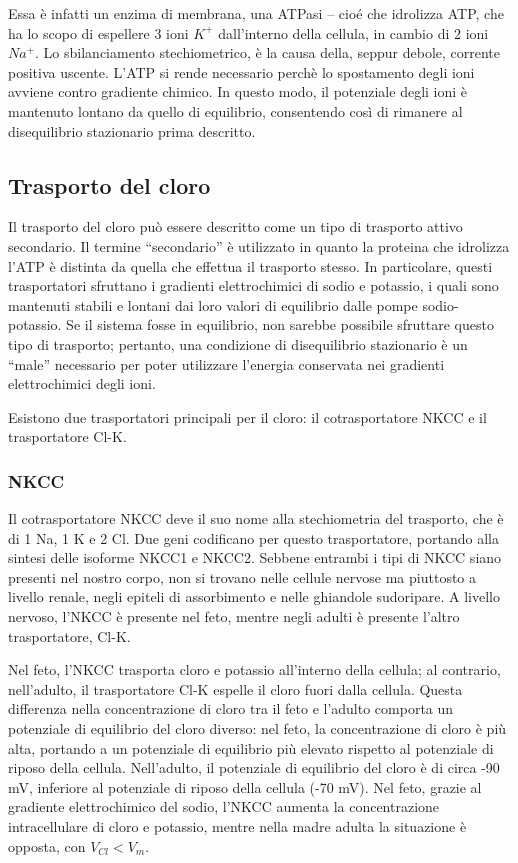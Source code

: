Essa è infatti un enzima di membrana, una ATPasi -- cioé che idrolizza ATP, che ha lo scopo di espellere 3 ioni $K^+$ dall'interno della cellula, in cambio di 2 ioni $Na^+$. Lo sbilanciamento stechiometrico, è la causa della, seppur debole, corrente positiva uscente. L'ATP si rende necessario perchè lo spostamento degli ioni avviene contro gradiente chimico. In questo modo, il potenziale degli ioni è mantenuto lontano da quello di equilibrio, consentendo così di rimanere al disequilibrio stazionario prima descritto.


\subsection{Trasporto del cloro}
Il trasporto del cloro può essere descritto come un tipo di trasporto attivo secondario. Il termine “secondario” è utilizzato in quanto la proteina che idrolizza l’ATP è distinta da quella che effettua il trasporto stesso. In particolare, questi trasportatori sfruttano i gradienti elettrochimici di sodio e potassio, i quali sono mantenuti stabili e lontani dai loro valori di equilibrio dalle pompe sodio-potassio. Se il sistema fosse in equilibrio, non sarebbe possibile sfruttare questo tipo di trasporto; pertanto, una condizione di disequilibrio stazionario è un “male” necessario per poter utilizzare l’energia conservata nei gradienti elettrochimici degli ioni.

Esistono due trasportatori principali per il cloro: il cotrasportatore NKCC e il trasportatore Cl-K. 

\subsubsection{NKCC}
Il cotrasportatore NKCC deve il suo nome alla stechiometria del trasporto, che è di 1 Na, 1 K e 2 Cl. Due geni codificano per questo trasportatore, portando alla sintesi delle isoforme NKCC1 e NKCC2. Sebbene entrambi i tipi di NKCC siano presenti nel nostro corpo, non si trovano nelle cellule nervose ma piuttosto a livello renale, negli epiteli di assorbimento e nelle ghiandole sudoripare. A livello nervoso, l’NKCC è presente nel feto, mentre negli adulti è presente l’altro trasportatore, Cl-K. 

Nel feto, l’NKCC trasporta cloro e potassio all’interno della cellula; al contrario, nell’adulto, il trasportatore Cl-K espelle il cloro fuori dalla cellula. Questa differenza nella concentrazione di cloro tra il feto e l’adulto comporta un potenziale di equilibrio del cloro diverso: nel feto, la concentrazione di cloro è più alta, portando a un potenziale di equilibrio più elevato rispetto al potenziale di riposo della cellula. Nell’adulto, il potenziale di equilibrio del cloro è di circa -90 mV, inferiore al potenziale di riposo della cellula (-70 mV). Nel feto, grazie al gradiente elettrochimico del sodio, l’NKCC aumenta la concentrazione intracellulare di cloro e potassio, mentre nella madre adulta la situazione è opposta, con \( V_{Cl} < V_m \).

